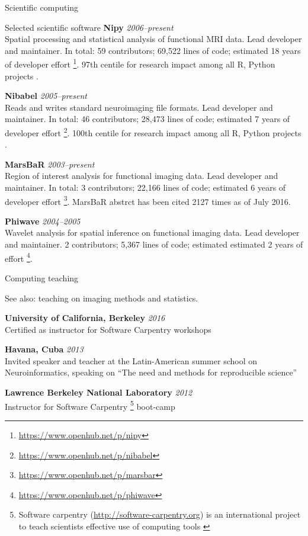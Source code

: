 \documentclass{cv}
\newcommand{\PlaceDateNote}[3]{{\bf #1} \hfill {\em #2} \\#3}
\newcommand{\UCB}{University of California, Berkeley}
\begin{document}
\begin{cvSection}{Scientific computing}
\begin{cvSubSection}{Selected scientific software}
\PlaceDateNote{Nipy}{2006--present}
{Spatial processing and statistical analysis
of functional MRI data.  Lead developer and maintainer.  In total: 59
contributors; 69,522 lines of code; estimated 18 years of developer effort
\footnote{\url{https://www.openhub.net/p/nipy}}.  97th centile for research
impact among all R, Python projects .}

\PlaceDateNote{Nibabel}{2005--present}
{Reads and writes standard neuroimaging file
    formats.  Lead developer and maintainer.  In total: 46 contributors;
    28,473 lines of code; estimated 7 years of developer effort
    \footnote{\url{https://www.openhub.net/p/nibabel}}.  100th centile for
    research impact among all R, Python projects \footref{depsy}.}

\PlaceDateNote{MarsBaR}{2003--present}
{Region of interest analysis for functional
    imaging data.  Lead developer and maintainer.  In total: 3 contributors;
22,166 lines of code; estimated 6 years of developer effort
\footnote{\url{https://www.openhub.net/p/marsbar}}.  MarsBaR abstrct has been
cited 2127 times as of July 2016.}

\PlaceDateNote{Phiwave}{2004--2005}
{Wavelet analysis for spatial inference on
functional imaging data.  Lead developer and maintainer.  2 contributors;
5,367 lines of code; estimated estimated 2 years of effort
\footnote{\url{https://www.openhub.net/p/phiwave}}.}

\end{cvSubSection}

\begin{cvSubSection}{Computing teaching}

See also: teaching on imaging methods and statistics.

\PlaceDateNote{\UCB}{2016}
{Certified as instructor for Software Carpentry workshops }

\PlaceDateNote{Havana, Cuba}{2013}
{Invited speaker and teacher at the Latin-American summer school on
Neuroinformatics, speaking on ``The need and methods for reproducible
science''}

\PlaceDateNote{Lawrence Berkeley National Laboratory}{2012}
{Instructor for Software Carpentry
    \footnote{
        Software carpentry (\url{http://software-carpentry.org}) is an
        international project to teach scientists effective use of computing
        tools
\label{swc}}
boot-camp}

\end{cvSubSection}


\end{cvSection}
\end{document}
